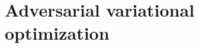 \documentclass[twocolumn,superscriptaddress,aps]{revtex4-1}
\theoremstyle{plain}
\begin{document}



\section{Adversarial variational optimization}
\end{document}
